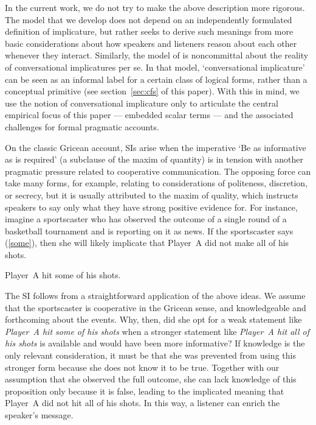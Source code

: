 \documentclass[leqno,12pt]{article}
\newcommand{\secref}[1]{section~\ref{#1}}
\newcommand{\eg}[1]{(\ref{#1})}
\newcommand{\word}[1]{\emph{#1}}
\begin{document}
{In the current work, we do not try to make the above description more
rigorous. The model that we develop does not depend on an
independently formulated definition of implicature, but rather seeks
to derive such meanings from more basic considerations about how
speakers and listeners reason about each other whenever they
interact. Similarly, the model of \citet{ChierchiaFoxSpector08} is
noncommittal about the reality of conversational implicatures per
se. In that model, `conversational implicature' can be seen as an informal
label for a certain class of logical forms, rather than a conceptual
primitive (see \secref{sec:cfs} of this paper). With this in mind, we
use the notion of conversational implicature only to articulate the
central empirical focus of this paper --- embedded scalar terms ---
and the associated challenges for formal pragmatic accounts.

On the classic Gricean account, SIs arise when the imperative `Be as
informative as is required' (a subclause of the maxim of quantity) is
in tension with another pragmatic pressure related to cooperative
communication. The opposing force can take many forms, for example,
relating to considerations of politeness, discretion, or secrecy, but
it is usually attributed to the maxim of quality, which instructs
speakers to say only what they have strong positive evidence for. For
instance, imagine a sportscaster who has observed the outcome of a
single round of a basketball tournament and is reporting on it as
news. If the sportscaster says \eg{some}, then she will likely
implicate that Player~A did not make all of his shots.
%
\begin{examples}
\item\label{some} Player~A hit some of his shots.
\end{examples}

The SI follows from a straightforward application of the above
ideas. We assume that the sportscaster is cooperative in the Gricean
sense, and knowledgeable and forthcoming about the events. Why, then,
did she opt for a weak statement like \word{Player~A hit some of his
  shots} when a stronger statement like \word{Player~A hit all of his
  shots} is available and would have been more informative?  If
knowledge is the only relevant consideration, it must be that she was
prevented from using this stronger form because she does not know it
to be true. Together with our assumption that she observed the full
outcome, she can lack knowledge of this proposition only because it is
false, leading to the implicated meaning that Player~A did not hit all
of his shots. In this way, a listener can enrich the speaker's
message.

}
\end{document}
